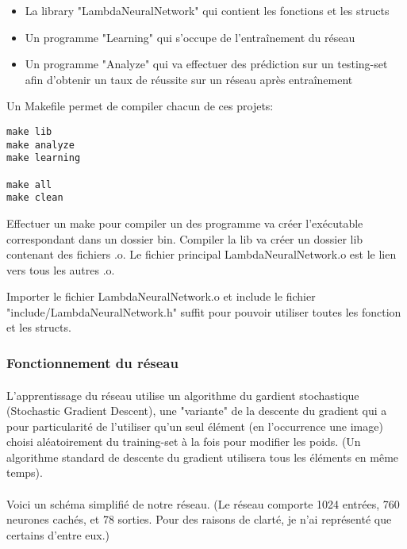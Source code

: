 \documentclass{article}
\begin{document}
\begin{itemize}
	\item La library "LambdaNeuralNetwork" qui contient les fonctions et les structs
	\item Un programme "Learning" qui s'occupe de l'entraînement du réseau
	\item Un programme "Analyze" qui va effectuer des prédiction sur un testing-set afin d'obtenir un taux de réussite sur un réseau après entraînement
\end{itemize}
Un Makefile permet de compiler chacun de ces projets:

\begin{lstlisting}
make lib
make analyze
make learning

make all
make clean
\end{lstlisting}

Effectuer un make pour compiler un des programme va créer l'exécutable correspondant dans un dossier bin.
Compiler la lib va créer un dossier lib contenant des fichiers .o. Le fichier principal LambdaNeuralNetwork.o est le lien vers tous les autres .o.

Importer le fichier LambdaNeuralNetwork.o et include le fichier "include/LambdaNeuralNetwork.h" suffit pour pouvoir utiliser toutes les fonction et les structs.


\subsubsection{Fonctionnement du réseau}

\paragraph{}L'apprentissage du réseau utilise un algorithme du gardient stochastique (Stochastic Gradient Descent), une "variante" de la descente du gradient qui a pour particularité de l'utiliser qu'un seul élément (en l'occurrence une image) choisi aléatoirement du training-set à la fois pour modifier les poids. (Un algorithme standard de descente du gradient utilisera tous les éléments en même temps).

\paragraph{}Voici un schéma simplifié de notre réseau.
(Le réseau comporte 1024 entrées, 760 neurones cachés, et 78 sorties. Pour des raisons de clarté, je n'ai représenté que certains d'entre eux.)
\end{document}
